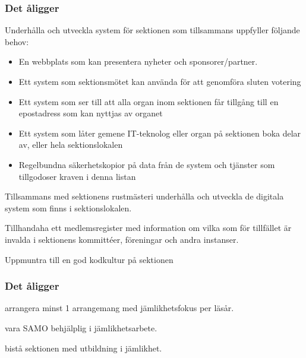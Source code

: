 \subsubsection{Det åligger \DIGIT}
\begin{att}
	\item Underhålla och utveckla system för sektionen som tillsammans uppfyller följande behov:
	\begin{itemize}
		\item En webbplats som kan presentera nyheter och sponsorer/partner.
		\item Ett system som sektionsmötet kan använda för att genomföra sluten votering
		\item Ett system som ser till att alla organ inom sektionen får tillgång till en epostadress som kan nyttjas av organet
		\item Ett system som låter gemene IT-teknolog eller organ på sektionen boka delar av, eller hela sektionslokalen
		\item Regelbundna säkerhetskopior på data från de system och tjänster som tillgodoser kraven i denna listan
	\end{itemize}
	\item Tillsammans med sektionens rustmästeri underhålla och utveckla de digitala system som finns i sektionslokalen.
	\item Tillhandaha ett medlemsregister med information om vilka som för tillfället är invalda i sektionens kommittéer, föreningar och andra instanser.
	\item Uppmuntra till en god kodkultur på sektionen
\end{att}

\subsubsection{Det åligger \EQUALIT{}}
\begin{att}
    \item arrangera minst 1 arrangemang med jämlikhetsfokus per läsår.
    \item vara SAMO behjälplig i jämlikhetsarbete.
    \item bistå sektionen med utbildning i jämlikhet.
\end{att}

